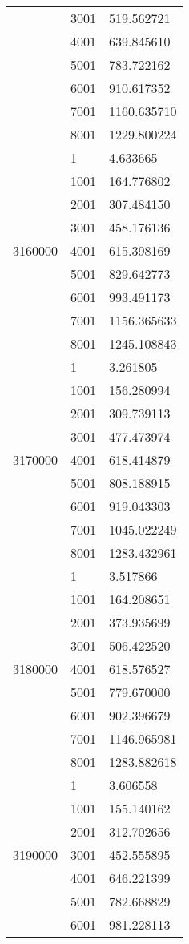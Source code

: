 \begin{table}[htb!]
\begin{tabular}{lll}
 & 3001 & 519.562721 \\
 & 4001 & 639.845610 \\
 & 5001 & 783.722162 \\
 & 6001 & 910.617352 \\
 & 7001 & 1160.635710 \\
 & 8001 & 1229.800224 \\
\multirow[c]{9}{*}{3160000} & 1 & 4.633665 \\
 & 1001 & 164.776802 \\
 & 2001 & 307.484150 \\
 & 3001 & 458.176136 \\
 & 4001 & 615.398169 \\
 & 5001 & 829.642773 \\
 & 6001 & 993.491173 \\
 & 7001 & 1156.365633 \\
 & 8001 & 1245.108843 \\
\multirow[c]{9}{*}{3170000} & 1 & 3.261805 \\
 & 1001 & 156.280994 \\
 & 2001 & 309.739113 \\
 & 3001 & 477.473974 \\
 & 4001 & 618.414879 \\
 & 5001 & 808.188915 \\
 & 6001 & 919.043303 \\
 & 7001 & 1045.022249 \\
 & 8001 & 1283.432961 \\
\multirow[c]{9}{*}{3180000} & 1 & 3.517866 \\
 & 1001 & 164.208651 \\
 & 2001 & 373.935699 \\
 & 3001 & 506.422520 \\
 & 4001 & 618.576527 \\
 & 5001 & 779.670000 \\
 & 6001 & 902.396679 \\
 & 7001 & 1146.965981 \\
 & 8001 & 1283.882618 \\
\multirow[c]{9}{*}{3190000} & 1 & 3.606558 \\
 & 1001 & 155.140162 \\
 & 2001 & 312.702656 \\
 & 3001 & 452.555895 \\
 & 4001 & 646.221399 \\
 & 5001 & 782.668829 \\
 & 6001 & 981.228113 \\

\end{tabular}
\end{table}
